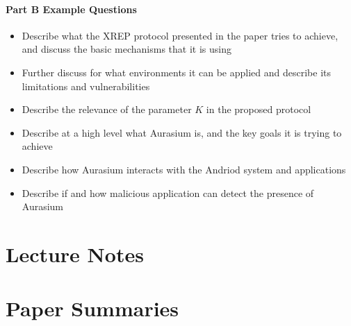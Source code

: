 \documentclass[12pt, a4paper]{report}
\begin{document}
\begin{multicols*}{2}
\subsubsection{Part B Example Questions}
\begin{itemize}
	\item Describe what the XREP protocol presented in the paper tries to achieve, and discuss the basic mechanisms that it is using
	\item Further discuss for what environments it can be applied and describe its limitations and vulnerabilities
	\item Describe the relevance of the parameter $K$ in the proposed protocol
	\item Describe at a high level what Aurasium is, and the key goals it is trying to achieve
	\item Describe how Aurasium interacts with the Andriod system and applications
	\item Describe if and how malicious application can detect the presence of Aurasium
\end{itemize}

\chapter{Lecture Notes}




\chapter{Paper Summaries}































\end{multicols*}
\end{document}
